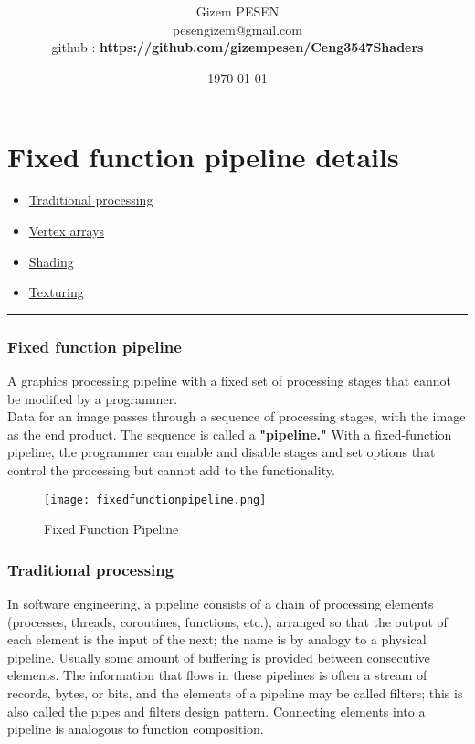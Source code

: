 \documentclass[onecolumn]{article}
\title{\spacecaps{CENG 3547 \\Computer Graphics \\HW2  \\FIXED FUNCTION PIPELINE VS PROGRAMMABLE SHADERS}\\ 
\color{blue!75!black}
\normalsize
\spacesc{} }
\author{Gizem PESEN\\pesengizem@gmail.com\\
github : \textbf{https://github.com/gizempesen/Ceng3547Shaders }}
\date{\today}
\begin{document}
\maketitle

\section{Fixed function pipeline details}
\label{sec:1}

\begin{itemize}
\color{blue!75!black}
\item \hyperref[sec:1.0.1]{Traditional processing}
\item \hyperref[sec:1.0.2]{Vertex arrays}
\item \hyperref[sec:1.0.3]{Shading}
\item \hyperref[sec:1.0.4]{Texturing}
\end{itemize}

\noindent
{\color{red} \rule{\linewidth}{0.5mm} }

\subsubsection{Fixed function pipeline}\label{sec:1}

\begin{story}
A graphics processing pipeline with a fixed set of processing stages that cannot be modified by a programmer.\\ Data for an image passes through a sequence of processing stages, with the image as the end product. The sequence is called a \textbf{"pipeline."} With a fixed-function pipeline, the programmer can enable and disable stages and set options that control the processing but cannot add to the functionality. 
\end{story}

\begin{figure}[ht!]
\centering
\texttt{[image: fixedfunctionpipeline.png]}
\caption{Fixed Function  Pipeline \label{}}
\end{figure}

\subsubsection{Traditional processing }\label{sec:1.0.1}

In software engineering, a pipeline consists of a chain of processing elements (processes, threads, coroutines, functions, etc.), arranged so that the output of each element is the input of the next; the name is by analogy to a physical pipeline. Usually some amount of buffering is provided between consecutive elements. The information that flows in these pipelines is often a stream of records, bytes, or bits, and the elements of a pipeline may be called filters; this is also called the pipes and filters design pattern. Connecting elements into a pipeline is analogous to function composition.
\end{document}
